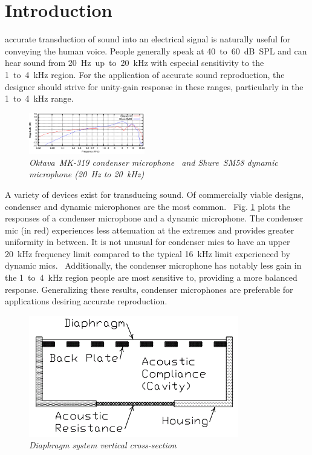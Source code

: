 \documentclass[journal]{IEEEtran}
\begin{document}
\section{Introduction}

 accurate transduction of sound into an electrical signal is naturally useful for conveying the human voice. People generally speak at 40~to~60~dB~SPL and can hear sound from 20~Hz~up~to~20~kHz with especial sensitivity to the 1~to~4~kHz region.\supercite{smith} For the application of accurate sound reproduction, the designer should strive for unity-gain response in these ranges, particularly in the 1~to~4~kHz range.

\begin{figure}[ht]
  \centering
	\includegraphics[width=0.45\textwidth]{OktavaMK319vsShureSM58.png}
  \caption{\em Oktava~MK-319 condenser microphone~\supercite{oktava} and Shure~SM58 dynamic microphone\supercite{shure} (20~Hz to 20~kHz)}
	\label{fig:OktavaMK319vsShureSM58}
\end{figure}

A variety of devices exist for transducing sound. Of commercially viable designs, condenser and dynamic microphones are the most common.~\supercite{shambro} Fig. \ref{fig:OktavaMK319vsShureSM58} plots the responses of a condenser microphone and a dynamic microphone. The condenser mic (in red) experiences less attenuation at the extremes and provides greater uniformity in between. It is not unusual for condenser mics to have an upper 20~kHz frequency limit compared to the typical 16~kHz limit experienced by dynamic mics.~\supercite{white} Additionally, the condenser microphone has notably less gain in the 1~to~4~kHz region people are most sensitive to, providing a more balanced response. Generalizing these results, condenser microphones are preferable for applications desiring accurate reproduction.

\begin{figure}[ht]
  \centering
	\includegraphics[scale=0.5]{DiaphragmSystem.png}
  \caption{\em Diaphragm system vertical cross-section~\supercite{torio}}
	\label{fig:DiaphragmSystem}
\end{figure}
\end{document}
